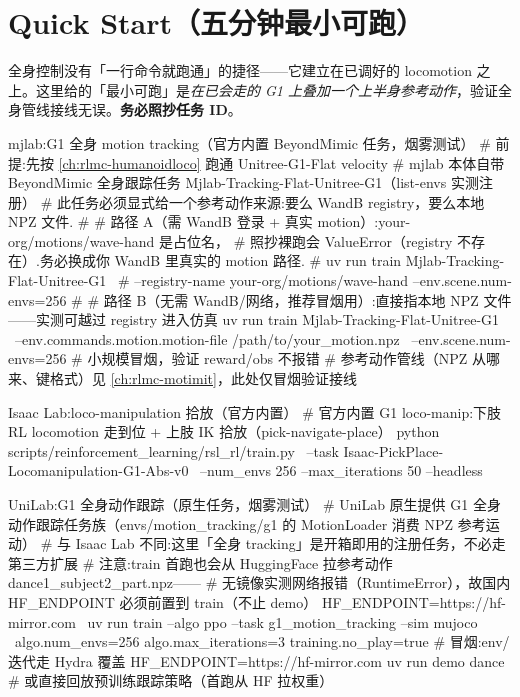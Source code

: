 \section*{Quick Start（五分钟最小可跑）}

全身控制没有「一行命令就跑通」的捷径——它建立在已调好的 locomotion 之上。这里给的「最小可跑」是\emph{在已会走的 G1 上叠加一个上半身参考动作}，验证全身管线接线无误。\textbf{务必照抄任务 ID}。

\begin{codebox}[bash]{mjlab:G1 全身 motion tracking（官方内置 BeyondMimic 任务，烟雾测试）}
# 前提:先按 \cref{ch:rlmc-humanoidloco} 跑通 Unitree-G1-Flat velocity
# mjlab 本体自带 BeyondMimic 全身跟踪任务 Mjlab-Tracking-Flat-Unitree-G1（list-envs 实测注册）
# 此任务必须显式给一个参考动作来源:要么 WandB registry，要么本地 NPZ 文件.
#
# 路径 A（需 WandB 登录 + 真实 motion）:your-org/motions/wave-hand 是占位名，
#   照抄裸跑会 ValueError（registry 不存在）.务必换成你 WandB 里真实的 motion 路径.
# uv run train Mjlab-Tracking-Flat-Unitree-G1 \
#   --registry-name your-org/motions/wave-hand --env.scene.num-envs=256
#
# 路径 B（无需 WandB/网络，推荐冒烟用）:直接指本地 NPZ 文件——实测可越过 registry 进入仿真
uv run train Mjlab-Tracking-Flat-Unitree-G1 \
  --env.commands.motion.motion-file /path/to/your_motion.npz \
  --env.scene.num-envs=256        # 小规模冒烟，验证 reward/obs 不报错
# 参考动作管线（NPZ 从哪来、键格式）见 \cref{ch:rlmc-motimit}，此处仅冒烟验证接线
\end{codebox}

\begin{codebox}[bash]{Isaac Lab:loco-manipulation 拾放（官方内置）}
# 官方内置 G1 loco-manip:下肢 RL locomotion 走到位 + 上肢 IK 拾放（pick-navigate-place）
python scripts/reinforcement_learning/rsl_rl/train.py \
  --task Isaac-PickPlace-Locomanipulation-G1-Abs-v0 \
  --num_envs 256 --max_iterations 50 --headless
\end{codebox}

\begin{codebox}[bash]{UniLab:G1 全身动作跟踪（原生任务，烟雾测试）}
# UniLab 原生提供 G1 全身动作跟踪任务族（envs/motion_tracking/g1 的 MotionLoader 消费 NPZ 参考运动）
# 与 Isaac Lab 不同:这里「全身 tracking」是开箱即用的注册任务，不必走第三方扩展
# 注意:train 首跑也会从 HuggingFace 拉参考动作 dance1_subject2_part.npz——
# 无镜像实测网络报错（RuntimeError），故国内 HF_ENDPOINT 必须前置到 train（不止 demo）
HF_ENDPOINT=https://hf-mirror.com \
uv run train --algo ppo --task g1_motion_tracking --sim mujoco \
    algo.num_envs=256 algo.max_iterations=3 training.no_play=true   # 冒烟:env/迭代走 Hydra 覆盖
HF_ENDPOINT=https://hf-mirror.com uv run demo dance   # 或直接回放预训练跟踪策略（首跑从 HF 拉权重）
\end{codebox}

